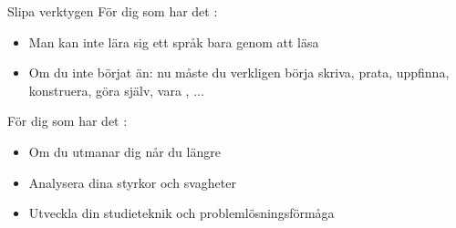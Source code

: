 %
%
%
%
%





\begin{Slide}{Slipa verktygen}
För dig som har det :
\begin{itemize}
\item Man kan inte lära sig ett språk bara genom att  läsa
\item Om du inte börjat än: nu måste du verkligen börja skriva, prata, uppfinna, konstruera, göra själv, vara , ...
\end{itemize}
För dig som har det :
\begin{itemize}
\item Om du utmanar dig når du  längre
\item Analysera dina styrkor och svagheter
\item Utveckla din studieteknik och problemlösningsförmåga
\end{itemize}
\end{Slide}

